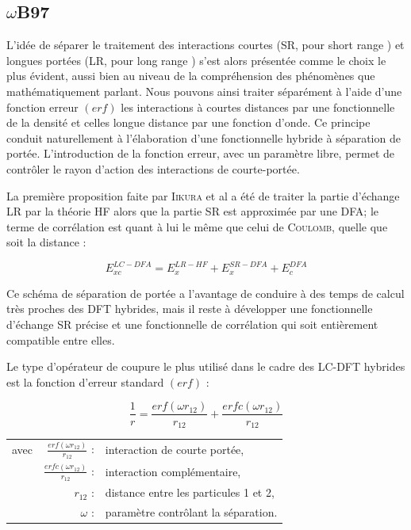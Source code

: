 {{\subsection{$\omega$B97}

L'idée de séparer le traitement des interactions courtes (SR, pour \og short range \fg{}) et longues portées (LR, pour \og long range \fg{}) s'est alors présentée comme le choix le plus évident, aussi bien au niveau de la compréhension des phénomènes que mathématiquement parlant. Nous pouvons ainsi traiter séparément à l'aide d'une fonction erreur $(erf)$ les interactions à courtes distances par une fonctionnelle de la densité et celles longue distance par une fonction d'onde. Ce principe conduit naturellement à l'élaboration d'une fonctionnelle hybride à séparation de portée. L'introduction de la fonction erreur, avec un paramètre libre, permet de contrôler le rayon d'action des interactions de courte-portée.

La première proposition faite par \textsc{Iikura} et al \cite{iikura2001long} a été de traiter la partie d'échange LR par la théorie HF alors que la partie SR est approximée par une DFA; le terme de corrélation est quant à lui le même que celui de \textsc{Coulomb}, quelle que soit la distance :

\begin{equation}
E_{xc}^{LC-DFA} = E_{x}^{LR-HF} + E_{x}^{SR-DFA} + E_{c}^{DFA}
\end{equation}

Ce schéma de séparation de portée a l'avantage de conduire à des temps de calcul très proches des DFT hybrides, mais il reste à développer une fonctionnelle d'échange SR précise et une fonctionnelle de corrélation qui soit entièrement compatible entre elles.

Le type d'opérateur de coupure le plus utilisé dans le cadre des LC-DFT hybrides est la fonction d'erreur standard $(erf)$ :

\begin{equation}
\frac{1}{r} = \frac{erf(\omega r_{12})}{r_{12}} + \frac{erfc(\omega r_{12})}{r_{12}}
\label{erf}
\end{equation}

\begin{flushleft}
\begin{tabular}{@{}lrp{10cm}}
avec & $\frac{erf(\omega r_{12})}{r_{12}}$ : & interaction de courte portée, \\
& $\frac{erfc(\omega r_{12})}{r_{12}}$ : & interaction complémentaire, \\
& $r_{12}$ : & distance entre les particules 1 et 2, \\
& $\omega$ : & paramètre contrôlant la séparation.
\end{tabular}
\end{flushleft}

}}
